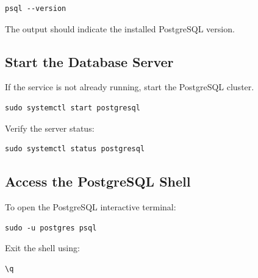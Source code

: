 \begin{lstlisting}[basicstyle=\footnotesize\ttfamily]
psql --version
\end{lstlisting}

The output should indicate the installed PostgreSQL version.

\subsection{Start the Database Server}
If the service is not already running, start the PostgreSQL cluster.

\begin{lstlisting}[basicstyle=\footnotesize\ttfamily]
sudo systemctl start postgresql
\end{lstlisting}

Verify the server status:

\begin{lstlisting}[basicstyle=\footnotesize\ttfamily]
sudo systemctl status postgresql
\end{lstlisting}

\subsection{Access the PostgreSQL Shell}
To open the PostgreSQL interactive terminal:

\begin{lstlisting}[basicstyle=\footnotesize\ttfamily]
sudo -u postgres psql
\end{lstlisting}

Exit the shell using:

\begin{lstlisting}[basicstyle=\footnotesize\ttfamily]
\q
\end{lstlisting}

